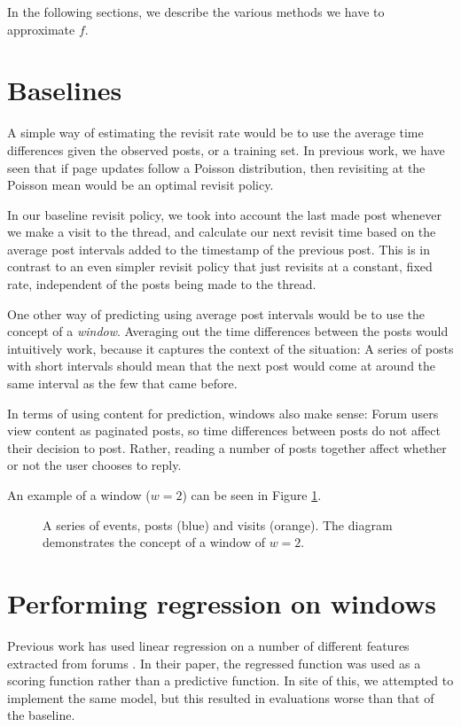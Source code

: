 In the following sections, we describe the various methods we have to 
approximate $f$.

\section{Baselines}
A simple way of estimating the revisit rate would be to use the average time 
differences given the observed posts, or a training set. In previous work, we 
have seen that if page updates follow a Poisson distribution, then revisiting at 
the Poisson mean would be an optimal revisit policy. %

In our baseline revisit policy, we took into account the last made post whenever 
we make a visit to the thread, and calculate our next revisit time based on the 
average post intervals added to the timestamp of the previous post. This is in 
contrast to an even simpler revisit policy that just revisits at a constant, 
fixed rate, independent of the posts being made to the thread.

One other way of predicting using average post intervals would be to use the 
concept of a \emph{window}. Averaging out the time differences between the posts 
would intuitively work, because it captures the context of the situation: A 
series of posts with short intervals should mean that the next post would come 
at around the same interval as the few that came before.

In terms of using content for prediction, windows also make sense: Forum users 
view content as paginated posts, so time differences between posts do not affect 
their decision to post. Rather, reading a number of posts together affect 
whether or not the user chooses to reply.

An example of a window ($w=2$) can be seen in Figure \ref{fig:event_series}.

\begin{figure}
	\begin{center}
	
	\caption{%
A series of events, posts (blue) and visits (orange).  The diagram demonstrates 
the concept of a window of $w=2$.
}\label{fig:event_series}
	\end{center}
\end{figure}


\section{Performing regression on windows}
Previous work has used linear regression on a number of different features 
extracted from forums \cite{Yang2009}. In their paper, the regressed function 
was used as a scoring function rather than a predictive function. In site of 
this, we attempted to implement the same model, but this resulted in evaluations 
worse than that of the baseline.

